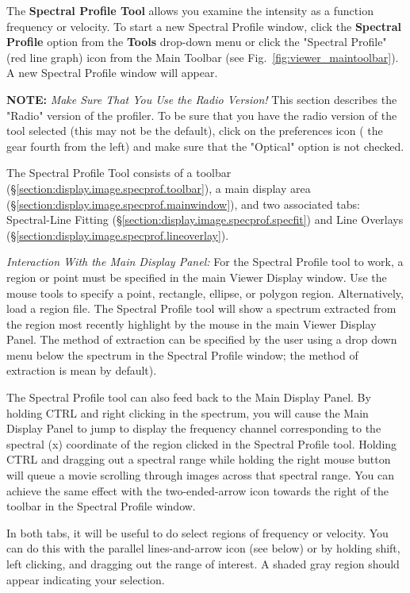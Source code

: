 The {\bf Spectral Profile Tool} allows you examine the intensity as a function
frequency or velocity. To start a new Spectral Profile window, click the 
{\bf Spectral Profile} option from the {\bf Tools} drop-down menu or click the 
"Spectral Profile" (red line graph) icon from the Main Toolbar 
(see Fig.~\ref{fig:viewer_maintoolbar}). A new Spectral Profile window will appear. 

{\bf NOTE:} {\em Make Sure That You Use the Radio Version!} This section describes the 
"Radio" version of the profiler. To be sure that you have the radio version of the tool
selected (this may not be the default), click on the preferences icon 
( the gear fourth from the left) and make sure that the "Optical" option is not checked.

The Spectral Profile Tool consists of a toolbar (\S \ref{section:display.image.specprof.toolbar}),
a main display area (\S \ref{section:display.image.specprof.mainwindow}), and two associated tabs:
Spectral-Line Fitting (\S \ref{section:display.image.specprof.specfit}) and Line Overlays 
(\S \ref{section:display.image.specprof.lineoverlay}).

{\em Interaction With the Main Display Panel:} For the Spectral Profile tool to work, a region or point
must be specified in the main Viewer Display window. Use the mouse tools to specify a point, 
rectangle, ellipse, or polygon region. Alternatively, load a region file. The Spectral Profile tool will show 
a spectrum extracted from the region most recently highlight by the mouse in the main Viewer Display Panel.
The method of extraction can be specified by the user using a drop down menu below the spectrum in 
the Spectral Profile window; the method of extraction is mean by default).

The Spectral Profile tool can also feed back to the Main Display Panel. By holding CTRL and right clicking
in the spectrum, you will cause the Main Display Panel to jump to display the frequency channel corresponding
to the spectral (x) coordinate of the region clicked in the Spectral Profile tool. Holding CTRL and dragging out
a spectral range while holding the right mouse button will queue a movie scrolling through images across that spectral range. You can achieve the
same effect with the two-ended-arrow icon towards the right of the toolbar in the Spectral Profile window.

In both tabs, it will be useful to do select regions of frequency or velocity. You can do this with the parallel lines-and-arrow
icon (see below) or by holding shift, left clicking, and dragging out the range of interest. A shaded gray region should appear
indicating your selection.

